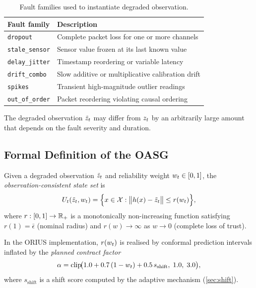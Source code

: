 \begin{table}[t]
\caption{Fault families used to instantiate degraded observation.}
\label{tab:oasg_fault_families}
\centering\footnotesize
\begin{tabularx}{\linewidth}{lX}
\toprule
\textbf{Fault family} & \textbf{Description} \\
\midrule
\texttt{dropout}        & Complete packet loss for one or more channels \\
\texttt{stale\_sensor}  & Sensor value frozen at its last known value \\
\texttt{delay\_jitter}  & Timestamp reordering or variable latency \\
\texttt{drift\_combo}   & Slow additive or multiplicative calibration drift \\
\texttt{spikes}         & Transient high-magnitude outlier readings \\
\texttt{out\_of\_order} & Packet reordering violating causal ordering \\
\bottomrule
\end{tabularx}
\end{table}

The degraded observation $\tilde{z}_t$ may differ from $z_t$ by an arbitrarily large amount
that depends on the fault severity and duration.

\subsection{Formal Definition of the OASG}

\begin{definition}\label{def:ocss}
Given a degraded observation $\tilde{z}_t$ and reliability weight $w_t \in [0,1]$, the
\emph{observation-consistent state set} is
\begin{equation}\label{eq:ocss}
  U_t(\tilde{z}_t, w_t) = \Bigl\{x \in \mathcal{X} :
    \bigl\lVert h(x) - \tilde{z}_t \bigr\rVert \le r(w_t) \Bigr\},
\end{equation}
where $r : [0,1] \to \mathbb{R}_+$ is a monotonically non-increasing function satisfying
$r(1) = \bar\epsilon$ (nominal radius) and $r(w) \to \infty$ as $w \to 0$ (complete
loss of trust).
\end{definition}

In the ORIUS implementation, $r(w_t)$ is realised by conformal prediction intervals
inflated by the \emph{planned contract factor}
\begin{equation}\label{eq:inflation}
  \alpha = \mathrm{clip}\!\bigl(1.0 + 0.7\,(1-w_t) + 0.5\,s_{\mathrm{shift}},\; 1.0,\; 3.0\bigr),
\end{equation}
where $s_{\mathrm{shift}}$ is a shift score computed by the adaptive mechanism
(\cref{sec:shift}).

